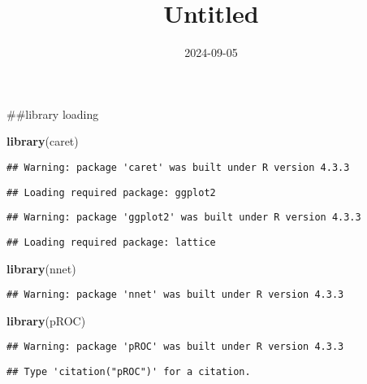 \documentclass[
]{article}
\title{Untitled}
\author{}
\date{\vspace{-2.5em}2024-09-05}
\newenvironment{Shaded}{\begin{snugshade}}{\end{snugshade}}
\newcommand{\FunctionTok}[1]{\textcolor[rgb]{0.13,0.29,0.53}{\textbf{#1}}}
\newcommand{\NormalTok}[1]{#1}
\begin{document}
\maketitle

\#\#library loading

\begin{Shaded}
\begin{Highlighting}[]
\FunctionTok{library}\NormalTok{(caret)}
\end{Highlighting}
\end{Shaded}

\begin{verbatim}
## Warning: package 'caret' was built under R version 4.3.3
\end{verbatim}

\begin{verbatim}
## Loading required package: ggplot2
\end{verbatim}

\begin{verbatim}
## Warning: package 'ggplot2' was built under R version 4.3.3
\end{verbatim}

\begin{verbatim}
## Loading required package: lattice
\end{verbatim}

\begin{Shaded}
\begin{Highlighting}[]
\FunctionTok{library}\NormalTok{(nnet)}
\end{Highlighting}
\end{Shaded}

\begin{verbatim}
## Warning: package 'nnet' was built under R version 4.3.3
\end{verbatim}

\begin{Shaded}
\begin{Highlighting}[]
\FunctionTok{library}\NormalTok{(pROC)}
\end{Highlighting}
\end{Shaded}

\begin{verbatim}
## Warning: package 'pROC' was built under R version 4.3.3
\end{verbatim}

\begin{verbatim}
## Type 'citation("pROC")' for a citation.
\end{verbatim}
\end{document}

